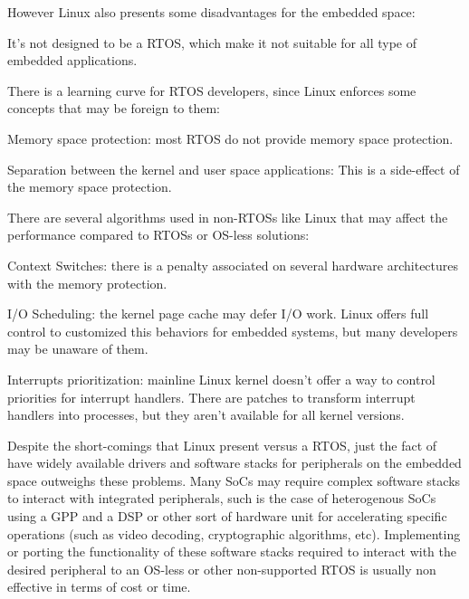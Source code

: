 However Linux also presents some disadvantages for the embedded space:
\begin{itemize*}
\item It's not designed to be a \ac{RTOS}, which make it not suitable for all type of embedded applications.
\item There is a learning curve for \ac{RTOS} developers, since Linux enforces some concepts that may be foreign to them:
	\begin{itemize*}
	\item Memory space protection: most \ac{RTOS} do not provide memory space protection.
	\item Separation between the kernel and user space applications: This is a side-effect of the memory space protection.
	\end{itemize*}
\item There are several algorithms used in non-\acp{RTOS} like Linux that may affect the performance compared to \acp{RTOS} or \ac{OS}-less solutions:
	\begin{itemize*}
	\item Context Switches: there is a penalty associated on several hardware architectures with the memory protection.
	\item I/O Scheduling: the kernel page cache may defer I/O work. Linux offers full control to customized this behaviors for embedded systems, but many developers may be unaware of them.
	\item Interrupts prioritization: mainline Linux kernel doesn't offer a way to control priorities for interrupt handlers. There are patches to transform interrupt handlers into processes, but they aren't available for all kernel versions.
	\end{itemize*}
\end{itemize*}

Despite the short-comings that Linux present versus a \ac{RTOS}, just the fact of have widely available drivers and software stacks for peripherals on the embedded space outweighs these problems. Many \acp{SoC} may require complex software stacks to interact with integrated peripherals, such is the case of heterogenous \acp{SoC} using a \ac{GPP} and a \ac{DSP} or other sort of hardware unit for accelerating specific operations (such as video decoding, cryptographic algorithms, etc). Implementing or porting the functionality of these software stacks required to interact with the desired peripheral to an \ac{OS}-less or other non-supported \ac{RTOS} is usually non effective in terms of cost or time.

